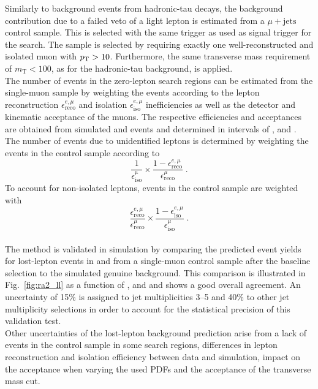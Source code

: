 Similarly to background events from hadronic-tau decays, the background contribution due to a failed veto of a light lepton is estimated from a $\mu + \mathrm{jets}$ control sample. This is selected with the same trigger as used as signal trigger for the search. The sample is selected by requiring exactly one well-reconstructed and isolated muon with $p_{\text{T}} > 10$\gev. Furthermore, the same transverse mass requirement of $m_\mathrm{T} < 100$\gev, as for the hadronic-tau background, is applied. \\
The number of events in the zero-lepton search regions can be estimated from the single-muon sample by weighting the events according to the lepton reconstruction $\epsilon_\mathrm{reco}^{e, \mu}$ and isolation $\epsilon_\mathrm{iso}^{e, \mu}$ inefficiencies as well as the detector and kinematic acceptance of the muons. The respective efficiencies and acceptances are obtained from simulated \ttbar and \WJets events and determined in intervals of \HT, \MHT and \NJets. \\
The number of events due to unidentified leptons is determined by weighting the events in the control sample according to
\begin{equation*}
\frac{1}{\epsilon_\mathrm{iso}^\mathrm{\mu}} \times \frac{1-\epsilon_\mathrm{reco}^{e, \mu}}{\epsilon_\mathrm{reco}^{\mu}} \; .
\end{equation*}
To account for non-isolated leptons, events in the control sample are weighted with
\begin{equation*}
\frac{\epsilon_\mathrm{reco}^{e, \mu}}{\epsilon_\mathrm{reco}^{\mu}} \times \frac{1-\epsilon_\mathrm{iso}^{e, \mu}}{\epsilon_\mathrm{iso}^{\mu}} \; .
\end{equation*}
\\
The method is validated in simulation by comparing the predicted event yields for lost-lepton events in \ttbar and \WJets from a single-muon control sample after the baseline selection to the simulated genuine background. This comparison is illustrated in Fig.~\ref{fig:ra2_ll} as a function of \HT, \MHT and \NJets and shows a good overall agreement. An uncertainty of 15\% is assigned to jet multiplicities 3--5 and 40\% to other jet multiplicity selections in order to account for the statistical precision of this validation test. \\
Other uncertainties of the lost-lepton background prediction arise from a lack of events in the control sample in some search regions, differences in lepton reconstruction and isolation efficiency between data and simulation, impact on the acceptance when varying the used PDFs and the acceptance of the transverse mass cut.

